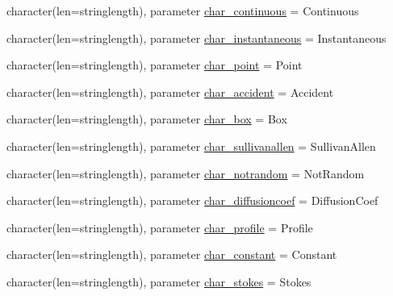 \begin{DoxyCompactItemize}
\item 
character(len=stringlength), parameter \mbox{\hyperlink{namespacemodulelagrangianglobal_a73a22e2486adc23fda36ea4096bb6f3f}{char\+\_\+continuous}} = \textquotesingle{}Continuous\textquotesingle{}
\item 
character(len=stringlength), parameter \mbox{\hyperlink{namespacemodulelagrangianglobal_a2ad0e99422a2ba20bc3cfaeca9f8b403}{char\+\_\+instantaneous}} = \textquotesingle{}Instantaneous\textquotesingle{}
\item 
character(len=stringlength), parameter \mbox{\hyperlink{namespacemodulelagrangianglobal_ad4ad6727c1b4f305f002d4480562fa1d}{char\+\_\+point}} = \textquotesingle{}Point\textquotesingle{}
\item 
character(len=stringlength), parameter \mbox{\hyperlink{namespacemodulelagrangianglobal_a7b92a58d2eedd4d13283e156746f7b30}{char\+\_\+accident}} = \textquotesingle{}Accident\textquotesingle{}
\item 
character(len=stringlength), parameter \mbox{\hyperlink{namespacemodulelagrangianglobal_a53e3871a9468c7d2cf5509993d60f449}{char\+\_\+box}} = \textquotesingle{}Box\textquotesingle{}
\item 
character(len=stringlength), parameter \mbox{\hyperlink{namespacemodulelagrangianglobal_afdb4743d7d08dfaf8d2d30c1134e67a8}{char\+\_\+sullivanallen}} = \textquotesingle{}Sullivan\+Allen\textquotesingle{}
\item 
character(len=stringlength), parameter \mbox{\hyperlink{namespacemodulelagrangianglobal_a103224e1750898a205c52c118e2928c4}{char\+\_\+notrandom}} = \textquotesingle{}Not\+Random\textquotesingle{}
\item 
character(len=stringlength), parameter \mbox{\hyperlink{namespacemodulelagrangianglobal_a234c61a0915a1f75b69e303d31db4682}{char\+\_\+diffusioncoef}} = \textquotesingle{}Diffusion\+Coef\textquotesingle{}
\item 
character(len=stringlength), parameter \mbox{\hyperlink{namespacemodulelagrangianglobal_af6ac559e88380d9fe75440e8f1cf4391}{char\+\_\+profile}} = \textquotesingle{}Profile\textquotesingle{}
\item 
character(len=stringlength), parameter \mbox{\hyperlink{namespacemodulelagrangianglobal_aa34f822cfd80683c0cbdc706bdc274de}{char\+\_\+constant}} = \textquotesingle{}Constant\textquotesingle{}
\item 
character(len=stringlength), parameter \mbox{\hyperlink{namespacemodulelagrangianglobal_a2e9f96bca2079870ccfeefc126adbdc7}{char\+\_\+stokes}} = \textquotesingle{}Stokes\textquotesingle{}

\end{DoxyCompactItemize}
